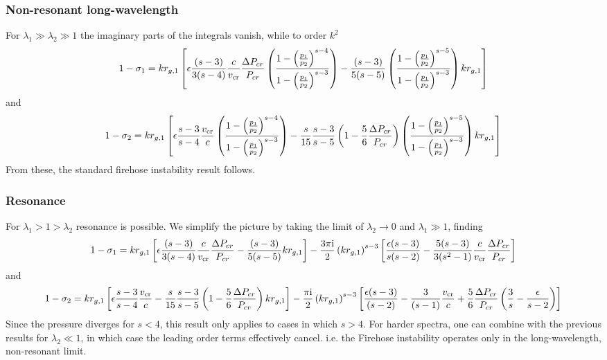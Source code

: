 \documentclass[a4paper,fleqn,usenatbib]{mnras}
\begin{document}
\subsubsection{Non-resonant long-wavelength}
For $\lambda_{1} \gg \lambda_2\gg 1 $ the imaginary parts of the integrals vanish, while to order $k^2$ 
\begin{equation}
\label{sig1-lw}
  1-\sigma_1 =k r_{g,1}\left[ \epsilon\frac{(s-3)}{3(s-4)} \frac{c}{v_{\rm cr}}\frac{\Delta P_{cr}}{P_{cr}}
 \left( \frac{1-\left(\frac{p_1}{p_2}\right)^{s-4}}{1-\left(\frac{p_1}{p_2}\right)^{s-3}}  \right)
  -\frac{(s-3)}{5(s-5) } \left(\frac{1-\left(\frac{p_1}{p_2}\right)^{s-5}}{1-\left(\frac{p_1}{p_2}\right)^{s-3}} \right)
    k r_{g,1} \right]
 \end{equation}
 and \begin{equation}
  1-\sigma_2 = k r_{g,1}\left[ \epsilon \frac{s-3}{s-4}\frac{v_{\rm cr}}{c} 
   \left(\frac{1-\left(\frac{p_1}{p_2}\right)^{s-4}}{1-\left(\frac{p_1}{p_2}\right)^{s-3}} \right)
  -\frac{s}{15}\frac{s-3}{s-5}\left(1-\frac{5}{6}\frac{\Delta P_{cr}}{P_{cr}} \right)
     \left(\frac{1-\left(\frac{p_1}{p_2}\right)^{s-5}}{1-\left(\frac{p_1}{p_2}\right)^{s-3}} \right)    k r_{g,1} \right]
 \end{equation}
 From these, the standard firehose instability result follows.

\subsubsection{Resonance}
For $\lambda_{1} > 1 > \lambda_2 $  resonance is possible. We simplify the picture by taking the limit of $\lambda_2\rightarrow 0$ and $\lambda_{1} \gg 1 $,  finding
\begin{equation}
\label{sig1-res}
  1-\sigma_1 =k r_{g,1}\left[ \epsilon\frac{(s-3)}{3(s-4)} \frac{c}{v_{\rm cr}}\frac{\Delta P_{cr}}{P_{cr}}
  -\frac{(s-3)}{5(s-5) }  k r_{g,1} \right] - \frac{3 \pi {\rm i}}{2} \left(k r_{g,1}\right)^{s-3}
  \left[ \frac{\epsilon(s-3)}{s(s-2)} -\frac{5(s-3)}{3(s^2-1)} \frac{c}{v_{\rm cr}}\frac{\Delta P_{cr}}{P_{cr}}\right]
 \end{equation}
  and \begin{equation}
  \label{sig2-res}
  1-\sigma_2 = k r_{g,1}\left[ \epsilon \frac{s-3}{s-4}\frac{v_{\rm cr}}{c} 
  -\frac{s}{15}\frac{s-3}{s-5}\left(1-\frac{5}{6}\frac{\Delta P_{cr}}{P_{cr}} \right)   k r_{g,1} \right]
  - \frac{ \pi {\rm i}}{2} \left(k r_{g,1}\right)^{s-3}
  \left[ \frac{\epsilon(s-3)}{(s-2)} -\frac{3}{(s-1)} \frac{v_{\rm cr}}{c}+
  \frac{5}{6}\frac{\Delta P_{cr}}{P_{cr}}  \left( \frac{3}{s}- \frac{\epsilon}{s-2}\right)\right]
 \end{equation}
Since the pressure diverges for $s<4$, this result only applies to cases in which $s>4$. For harder spectra, one can combine with the previous results for $\lambda_2\ll1$, in which case the leading order terms effectively cancel. i.e. the Firehose instability operates only in the long-wavelength, non-resonant limit.



\bsp	%
\label{lastpage}
\end{document}
